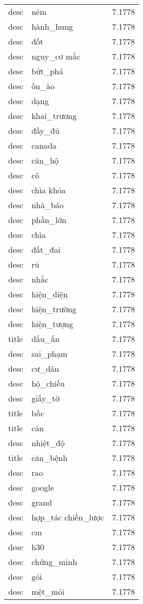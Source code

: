 \documentclass{article}
\begin{document}
\begin{tabular}{lll}
desc & ném & 7.1778\\
desc & hành\_hung & 7.1778\\
desc & đốt & 7.1778\\
desc & nguy\_cơ mắc & 7.1778\\
desc & bứt\_phá & 7.1778\\
desc & ồn\_ào & 7.1778\\
desc & dạng & 7.1778\\
desc & khai\_trương & 7.1778\\
desc & đầy\_đủ & 7.1778\\
desc & canada & 7.1778\\
desc & căn\_hộ & 7.1778\\
desc & cô & 7.1778\\
desc & chìa khóa & 7.1778\\
desc & nhà\_báo & 7.1778\\
desc & phần\_lớn & 7.1778\\
desc & chìa & 7.1778\\
desc & đất\_đai & 7.1778\\
desc & rủ & 7.1778\\
desc & nhắc & 7.1778\\
desc & hiện\_diện & 7.1778\\
desc & hiện\_trường & 7.1778\\
desc & hiện\_tượng & 7.1778\\
title & dấu\_ấn & 7.1778\\
desc & sai\_phạm & 7.1778\\
desc & cư\_dân & 7.1778\\
desc & hộ\_chiếu & 7.1778\\
desc & giấy\_tờ & 7.1778\\
title & bốc & 7.1778\\
title & cán & 7.1778\\
desc & nhiệt\_độ & 7.1778\\
title & căn\_bệnh & 7.1778\\
desc & rao & 7.1778\\
desc & google & 7.1778\\
desc & grand & 7.1778\\
desc & hợp\_tác chiến\_lược & 7.1778\\
desc & cm & 7.1778\\
desc & h30 & 7.1778\\
desc & chứng\_minh & 7.1778\\
desc & gói & 7.1778\\
desc & mệt\_mỏi & 7.1778\\

\end{tabular}
\end{document}
